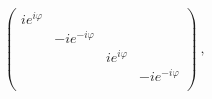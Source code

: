 \begin{equation*}
  \begin{pmatrix}
    i e^{i\varphi} & & & \\
    & -i e^{-i\varphi} & & \\
    & & i e^{i\varphi} & \\
    & & & -i e^{-i\varphi} \\
  \end{pmatrix}~,
\end{equation*}

